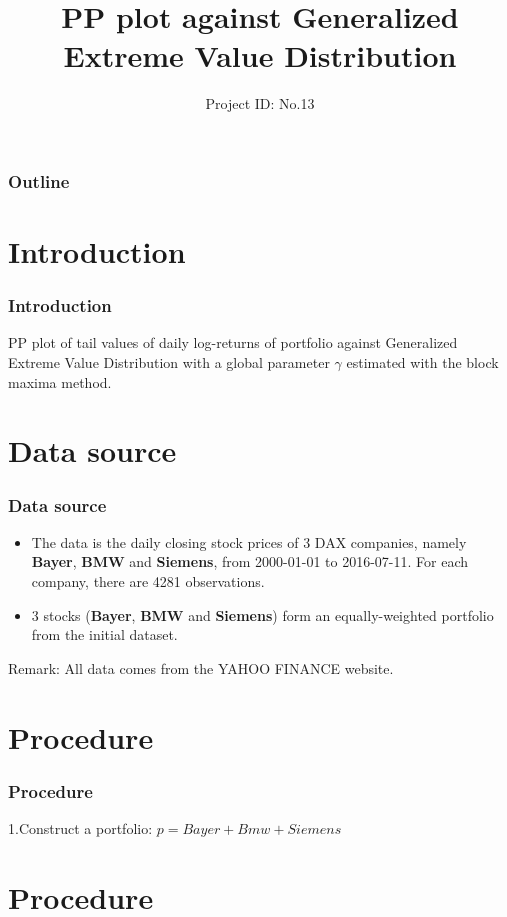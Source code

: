 \documentclass[12pt]{beamer}
\title{PP plot against Generalized Extreme Value Distribution}
\author[Group ID: No.12]{Project ID: No.13} %
\institute[]{
	\textsl{Group ID: No.12}
}
\date[July 18$^{th}, 2016$]{} %
\begin{document}
	
\begin{frame}
	\titlepage
\end{frame}


\begin{frame}
	\frametitle{Outline}
	\tableofcontents
\end{frame}

\section{Introduction}

\begin{frame}
	\frametitle{Introduction}
	\quad  PP plot of tail values of daily log-returns of portfolio against Generalized Extreme Value Distribution with a global parameter $\gamma$ estimated with the block maxima method.
\end{frame}




\section{Data source}
\begin{frame}
	\frametitle{Data source}
    \begin{itemize}
	  \item The data is the daily closing stock prices of 3 DAX companies, namely \textbf{Bayer}, \textbf{BMW} and \textbf{Siemens}, from 2000-01-01 to 2016-07-11. For each company, there are 4281 observations.\\
      \item 3 stocks (\textbf{Bayer}, \textbf{BMW} and \textbf{Siemens}) form an equally-weighted portfolio from the initial dataset.
    \end{itemize}
    \quad Remark: All data comes from the YAHOO FINANCE website.
\end{frame}


\section{Procedure}
\begin{frame}
	\frametitle{Procedure}
		1.Construct a portfolio: $p=Bayer+Bmw+Siemens$
\end{frame}


\section{Procedure}
\end{document}
